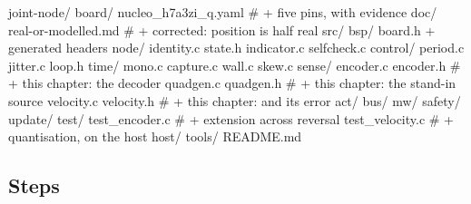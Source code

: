\begin{plaincode}
joint-node/
  board/  nucleo_h7a3zi_q.yaml            # + five pins, with evidence
  doc/    real-or-modelled.md             # + corrected: position is half real
  src/
    bsp/     board.h + generated headers
    node/    identity.c state.h indicator.c selfcheck.c
    control/ period.c jitter.c loop.h
    time/    mono.c capture.c wall.c skew.c
    sense/
      encoder.c  encoder.h                # + this chapter: the decoder
      quadgen.c  quadgen.h                # + this chapter: the stand-in source
      velocity.c velocity.h               # + this chapter: and its error
    act/  bus/  mw/  safety/  update/
  test/
    test_encoder.c                        # + extension across reversal
    test_velocity.c                       # + quantisation, on the host
  host/  tools/  README.md
\end{plaincode}

\subsection*{Steps}


